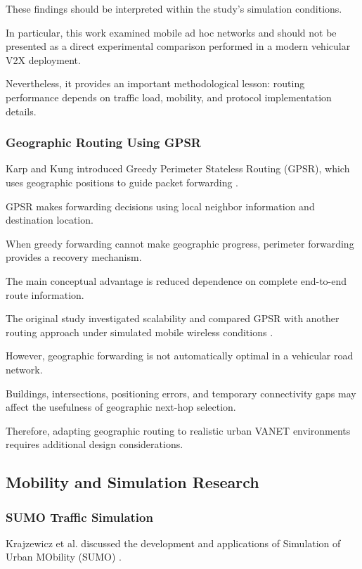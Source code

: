 These findings should be
interpreted within the
study's simulation conditions.

In particular, this work
examined mobile ad hoc
networks and should not
be presented as a direct
experimental comparison
performed in a modern
vehicular V2X deployment.

Nevertheless, it provides
an important methodological
lesson: routing performance
depends on traffic load,
mobility, and protocol
implementation details.

\subsubsection{Geographic Routing Using GPSR}

Karp and Kung introduced
Greedy Perimeter Stateless
Routing (GPSR), which uses
geographic positions to
guide packet forwarding
\cite{Karp2000}.

GPSR makes forwarding
decisions using local
neighbor information
and destination location.

When greedy forwarding
cannot make geographic
progress, perimeter
forwarding provides
a recovery mechanism.

The main conceptual
advantage is reduced
dependence on complete
end-to-end route
information.

The original study
investigated scalability
and compared GPSR
with another routing
approach under simulated
mobile wireless
conditions \cite{Karp2000}.

However, geographic
forwarding is not
automatically optimal
in a vehicular road
network.

Buildings, intersections,
positioning errors, and
temporary connectivity
gaps may affect the
usefulness of geographic
next-hop selection.

Therefore, adapting
geographic routing
to realistic urban
VANET environments
requires additional
design considerations.

\subsection{Mobility and Simulation Research}

\subsubsection{SUMO Traffic Simulation}

Krajzewicz et al. discussed
the development and
applications of Simulation
of Urban MObility (SUMO)
\cite{Krajzewicz2012}.

